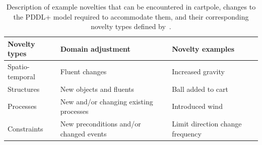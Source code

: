 \documentclass[letterpaper]{article} %
\begin{document}
\begin{table}[tbh!]
	\centering
	\footnotesize
	\begin{tabular}{p{} | p{} | p{}}
		\hline
		\textbf{Novelty types} & \textbf{Domain adjustment} & \textbf{Novelty examples} \\
		\hline
		Spatio-temporal  & Fluent changes & Increased gravity \\
		Structures  & New objects and fluents & Ball added to cart \\
		Processes  & New and/or changing existing processes & Introduced wind \\
		Constraints & New preconditions and/or changed events & Limit direction change frequency \\
		
		\hline
	\end{tabular}
	\caption{Description of example novelties that can be encountered in cartpole, changes to the PDDL+ model required to accommodate them, and their corresponding novelty types  defined by~\protect\cite{langley2020open}.} %
\label{tab:novelties_pddl}
\end{table}
\end{document}
